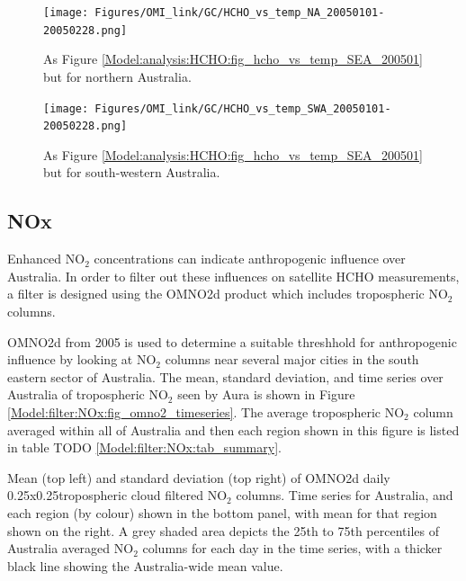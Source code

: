         \begin{figure}
          \texttt{[image: Figures/OMI\_link/GC/HCHO\_vs\_temp\_NA\_20050101-20050228.png]}
          \caption{%
            As Figure \ref{Model:analysis:HCHO:fig_hcho_vs_temp_SEA_200501} but for northern Australia.
            }
          \label{Model:analysis:HCHO:fig_hcho_vs_temp_NA_200501}
        \end{figure}
          
        \begin{figure}
          \texttt{[image: Figures/OMI\_link/GC/HCHO\_vs\_temp\_SWA\_20050101-20050228.png]}
          \caption{%
            As Figure \ref{Model:analysis:HCHO:fig_hcho_vs_temp_SEA_200501} but for south-western Australia.
            }
          \label{Model:analysis:HCHO:fig_hcho_vs_temp_SWA_200501}
        \end{figure}
  
  \subsection{NOx}
    \label{Model:filter:NOx}
    
    Enhanced NO$_2$ concentrations can indicate anthropogenic influence over Australia.
    In order to filter out these influences on satellite HCHO measurements, a filter is designed using the OMNO2d product which includes tropospheric NO$_2$ columns.
    
    OMNO2d from 2005 is used to determine a suitable threshhold for anthropogenic influence by looking at NO$_2$ columns near several major cities in the south eastern sector of Australia.
    The mean, standard deviation, and time series over Australia of tropospheric NO$_2$ seen by Aura is shown in Figure \ref{Model:filter:NOx:fig_omno2_timeseries}.
    The average tropospheric NO$_2$ column averaged within all of Australia and then each region shown in this figure is listed in table TODO \ref{Model:filter:NOx:tab_summary}.
    
    {Mean (top left) and standard deviation (top right) of OMNO2d daily 0.25x0.25\degr tropospheric cloud filtered NO$_2$ columns. Time series for Australia, and each region (by colour) shown in the bottom panel, with mean for that region shown on the right. A grey shaded area depicts the 25th to 75th percentiles of Australia averaged NO$_2$ columns for each day in the time series, with a thicker black line showing the Australia-wide mean value.}
    {\label{Model:filter:NOx:fig_omno2_timeseries}}
    
